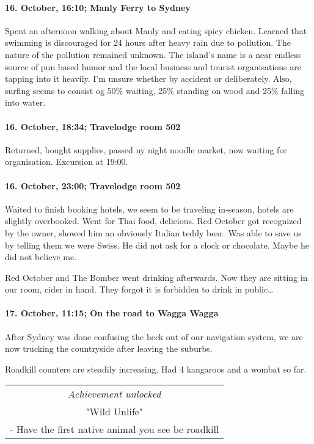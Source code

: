 \paragraph{16. October, 16:10; Manly Ferry to Sydney}
Spent an afternoon walking about Manly and eating spicy chicken.
Learned that swimming is discouraged for 24 hours after heavy rain due to pollution.
The nature of the pollution remained unknown.
The island's name is a near endless source of pun based humor and the local business and tourist organisations are tapping into it heavily.
I'm unsure whether by accident or deliberately.
Also, surfing seems to consist og 50\% waiting, 25\% standing on wood and 25\% falling into water.

\paragraph{16. October, 18:34; Travelodge room 502}
Returned, bought supplies, passed ny night noodle market, now waiting for organisation.
Excursion at 19:00.

\paragraph{16. October, 23:00; Travelodge room 502}
Waited to finish booking hotels, we seem to be traveling in-season, hotels are slightly overbooked.
Went for Thai food, delicious.
Red October got recognized by the owner, showed him an obviously Italian teddy bear.
Was able to save us by telling them we were Swiss.
He did not ask for a clock or chocolate.
Maybe he did not believe me.

Red October and The Bomber went drinking afterwards.
Now they are sitting in our room, cider in hand.
They forgot it is forbidden to drink in public\ldots{}

\paragraph{17. October, 11:15; On the road to Wagga Wagga}
After Sydney was done confusing the heck out of our navigation system, we are now trucking the countryside after leaving the suburbs.

Roadkill counters are steadily increasing.
Had 4 kangaroos and a wombat so far.

\begin{center}
\begin{tabular}{||c||}
\emph{Achievement unlocked}\\
"Wild Unlife"\\
\multicolumn{1}{||p{0.8\textwidth}||}{\footnotesize - Have the first native animal you see be roadkill} \\
\end{tabular}
\end{center}

